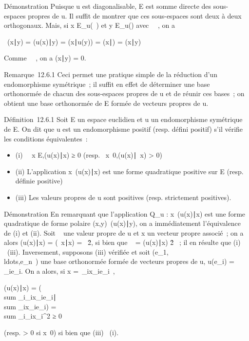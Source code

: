 \documentclass[]{article}
\begin{document}
Démonstration Puisque u est diagonalisable, E est somme directe des
sous-espaces propres de u. Il suffit de montrer que ces sous-espaces
sont deux à deux orthogonaux. Mais, si x \in E_u(\lambda~) et y \in
E_u(\mu) avec \lambda~\neq~\mu, on a

\lambda~(x∣y) = (u(x)\mathrel∣y)
= (x∣u(y)) =
(x∣\muy) = \mu(x\mathrel∣y)

Comme \lambda~\neq~\mu, on a
(x∣y) = 0.

Remarque~12.6.1 Ceci permet une pratique simple de la réduction d'un
endomorphisme symétrique~; il suffit en effet de déterminer une base
orthonormée de chacun des sous-espaces propres de u et de réunir ces
bases~; on obtient une base orthonormée de E formée de vecteurs propres
de u.

Définition~12.6.1 Soit E un espace euclidien et u un endomorphisme
symétrique de E. On dit que u est un endomorphisme positif (resp. défini
positif) s'il vérifie les conditions équivalentes~:

\begin{itemize}
\itemsep1pt\parskip0pt
\item
  (i) \forall~~x \in
  E,(u(x)∣x) ≥ 0 (resp.
  \forall~x\neq~0,(u(x)\mathrel∣~x)
  \textgreater{} 0)
\item
  (ii) L'application
  x\mapsto~(u(x)\mathrel∣x) est
  une forme quadratique positive sur E (resp. définie positive)
\item
  (iii) Les valeurs propres de u sont positives (resp. strictement
  positives).
\end{itemize}

Démonstration En remarquant que l'application Q_u :
x\mapsto~(u(x)\mathrel∣x) est une
forme quadratique de forme polaire
(x,y)\mapsto~(u(x)\mathrel∣y), on
a immédiatement l'équivalence de (i) et (ii). Soit \lambda~ une valeur propre
de u et x un vecteur propre associé~; on a alors
(u(x)∣x) = (\lambda~x\mathrel∣x)
= \lambda~\x\^2,
si bien que \lambda~ = (u(x)∣x)
\over
\x\^2 ~;
il en résulte que (i) \rigtharrow~(iii). Inversement, supposons (iii) vérifiée et
soit
(e_1,\\ldots,e_n~)
une base orthonormée formée de vecteurs propres de u, u(e_i) =
\lambda_ie_i. On a alors, si x =\
\sum  _ix_ie_i~,

(u(x)∣x) = (\\sum
_i\lambda_ix_ie_i∣\\sum
_ix_ie_i) = \\sum
_i\lambda_ix_i^2 ≥ 0

(resp. \textgreater{} 0 si x\neq~0) si bien que
(iii) \rigtharrow~(i).
\end{document}
